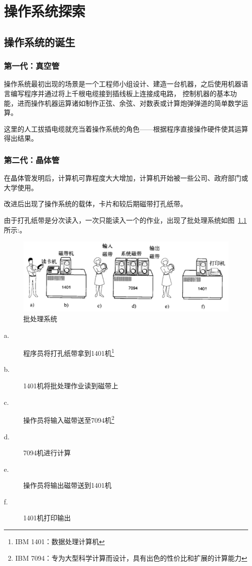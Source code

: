 \chapter{操作系统探索}

\section{操作系统的诞生}

\subsection{第一代：真空管}

操作系统最初出现的场景是一个工程师小组设计、建造一台机器，之后使用机器语言编写程序并通过将上千根电缆接到插线板上连接成电路，
控制机器的基本功能，进而操作机器运算诸如制作正弦、余弦、对数表或计算炮弹弹道的简单数学运算。

这里的人工拔插电缆就充当着操作系统的角色——根据程序直接操作硬件使其运算得出结果。


\subsection{第二代：晶体管}

在晶体管发明后，计算机可靠程度大大增加，计算机开始被一些公司、政府部门或大学使用。

改进后出现了操作系统的载体，卡片和较后期磁带打孔纸带。

由于打孔纸带是分次读入，一次只能读入一个的作业，出现了批处理系统如图~\ref{fig:btss}所示:。

\begin{figure}[h]
  \centering
  \includegraphics[width=.8\textwidth]{../Fig/btss.png}
  \caption{批处理系统}
  \label{fig:btss}
\end{figure}

\begin{description}
\item[a.]程序员将打孔纸带拿到1401机\footnote{IBM 1401：数据处理计算机\cite{1401dps}}
\item[b.]1401机将批处理作业读到磁带上
\item[c.]操作员将输入磁带送至7094机\footnote{IBM 7094：专为大型科学计算而设计，具有出色的性价比和扩展的计算能力\cite{7094dps}}
\item[d.]7094机进行计算
\item[e.]操作员将输出磁带送到1401机
\item[f.]1401机打印输出
\end{description}

